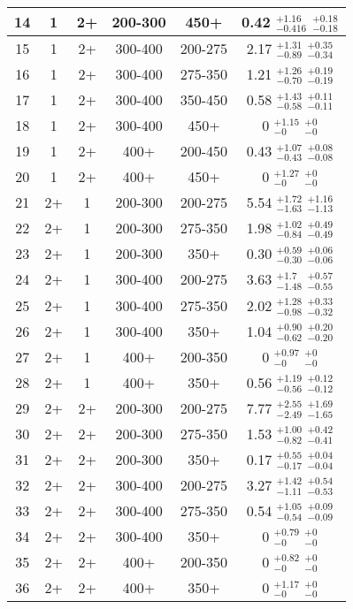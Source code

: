 \begin{table}[htbp]
\begin{centering}
\begin{lrbox}{\closureBox}
\begin{tabular}{|c|c|c|c|c||c|}
\hline
14 & 1 & 2+ & 200-300 & 450+ & 0.42 $^{+1.16}_{-0.416}$ $^{+0.18}_{-0.18}$ \\ 
\hline
15 & 1 & 2+ & 300-400 & 200-275 & 2.17 $^{+1.31}_{-0.89}$ $^{+0.35}_{-0.34}$ \\ 
\hline
16 & 1 & 2+ & 300-400 & 275-350 & 1.21 $^{+1.26}_{-0.70}$ $^{+0.19}_{-0.19}$ \\ 
\hline
17 & 1 & 2+ & 300-400 & 350-450 & 0.58 $^{+1.43}_{-0.58}$ $^{+0.11}_{-0.11}$ \\ 
\hline
18 & 1 & 2+ & 300-400 & 450+ & 0 $^{+1.15}_{-0}$ $^{+0}_{-0}$ \\ 
\hline
19 & 1 & 2+ & 400+ & 200-450 & 0.43 $^{+1.07}_{-0.43}$ $^{+0.08}_{-0.08}$ \\ 
\hline
20 & 1 & 2+ & 400+ & 450+ & 0 $^{+1.27}_{-0}$ $^{+0}_{-0}$ \\ 
\hline
21 & 2+ & 1 & 200-300 & 200-275 & 5.54 $^{+1.72}_{-1.63}$ $^{+1.16}_{-1.13}$ \\ 
\hline
22 & 2+ & 1 & 200-300 & 275-350 & 1.98 $^{+1.02}_{-0.84}$ $^{+0.49}_{-0.49}$ \\ 
\hline
23 & 2+ & 1 & 200-300 & 350+ & 0.30 $^{+0.59}_{-0.30}$ $^{+0.06}_{-0.06}$ \\ 
\hline
24 & 2+ & 1 & 300-400 & 200-275 & 3.63 $^{+1.7}_{-1.48}$ $^{+0.57}_{-0.55}$ \\ 
\hline
25 & 2+ & 1 & 300-400 & 275-350 & 2.02 $^{+1.28}_{-0.98}$ $^{+0.33}_{-0.32}$ \\ 
\hline
26 & 2+ & 1 & 300-400 & 350+ & 1.04 $^{+0.90}_{-0.62}$ $^{+0.20}_{-0.20}$ \\ 
\hline
27 & 2+ & 1 & 400+ & 200-350 & 0 $^{+0.97}_{-0}$ $^{+0}_{-0}$ \\ 
\hline
28 & 2+ & 1 & 400+ & 350+ & 0.56 $^{+1.19}_{-0.56}$ $^{+0.12}_{-0.12}$ \\ 
\hline
29 & 2+ & 2+ & 200-300 & 200-275 & 7.77 $^{+2.55}_{-2.49}$ $^{+1.69}_{-1.65}$ \\ 
\hline
30 & 2+ & 2+ & 200-300 & 275-350 & 1.53 $^{+1.00}_{-0.82}$ $^{+0.42}_{-0.41}$ \\ 
\hline
31 & 2+ & 2+ & 200-300 & 350+ & 0.17 $^{+0.55}_{-0.17}$ $^{+0.04}_{-0.04}$ \\ 
\hline
32 & 2+ & 2+ & 300-400 & 200-275 & 3.27 $^{+1.42}_{-1.11}$ $^{+0.54}_{-0.53}$ \\ 
\hline
33 & 2+ & 2+ & 300-400 & 275-350 & 0.54 $^{+1.05}_{-0.54}$ $^{+0.09}_{-0.09}$ \\ 
\hline
34 & 2+ & 2+ & 300-400 & 350+ & 0 $^{+0.79}_{-0}$ $^{+0}_{-0}$ \\ 
\hline
35 & 2+ & 2+ & 400+ & 200-350 & 0 $^{+0.82}_{-0}$ $^{+0}_{-0}$ \\ 
\hline
36 & 2+ & 2+ & 400+ & 350+ & 0 $^{+1.17}_{-0}$ $^{+0}_{-0}$ \\ 
\hline
\end{tabular}
\end{lrbox}
\scalebox{0.80}{\usebox{\closureBox}}
\par\end{centering}
\end{table}



